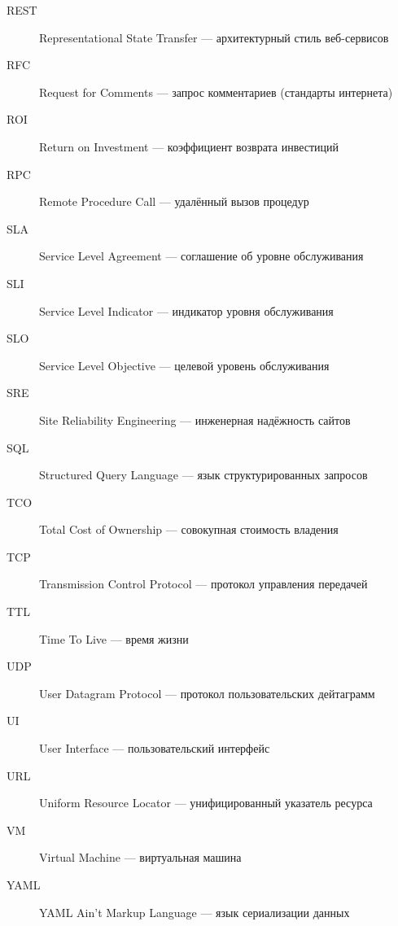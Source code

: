 \begin{sloppypar}
\begin{description}
    \item[REST] Representational State Transfer — архитектурный стиль веб-сервисов
    \item[RFC] Request for Comments — запрос комментариев (стандарты интернета)
    \item[ROI] Return on Investment — коэффициент возврата инвестиций
    \item[RPC] Remote Procedure Call — удалённый вызов процедур
    \item[SLA] Service Level Agreement — соглашение об уровне обслуживания
    \item[SLI] Service Level Indicator — индикатор уровня обслуживания
    \item[SLO] Service Level Objective — целевой уровень обслуживания
    \item[SRE] Site Reliability Engineering — инженерная надёжность сайтов
    \item[SQL] Structured Query Language — язык структурированных запросов
    \item[TCO] Total Cost of Ownership — совокупная стоимость владения
    \item[TCP] Transmission Control Protocol — протокол управления передачей
    \item[TTL] Time To Live — время жизни
    \item[UDP] User Datagram Protocol — протокол пользовательских дейтаграмм
    \item[UI] User Interface — пользовательский интерфейс
    \item[URL] Uniform Resource Locator — унифицированный указатель ресурса
    \item[VM] Virtual Machine — виртуальная машина
    \item[YAML] YAML Ain't Markup Language — язык сериализации данных
\end{description}
\end{sloppypar}

\newpage
